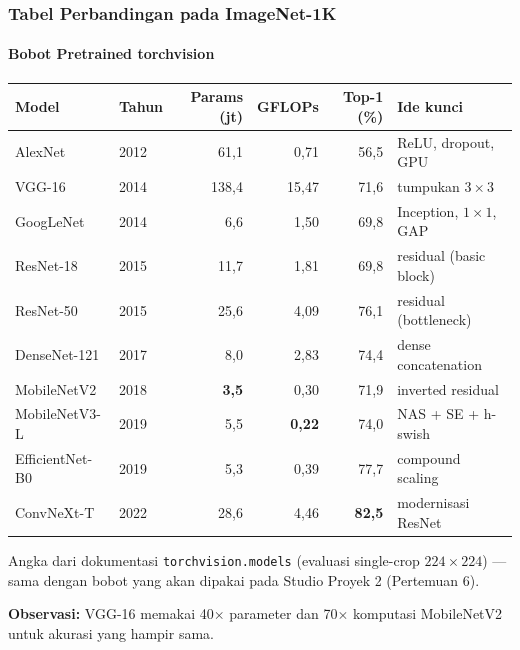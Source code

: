 \documentclass[t,aspectratio=169,xcolor=dvipsnames]{beamer}
\newcommand{\con}[1]{\textcolor{dlOrange}{#1}}
\begin{document}
\begin{frame}
    \frametitle{Tabel Perbandingan pada ImageNet-1K}
    \framesubtitle{Bobot Pretrained torchvision}
    \scriptsize
    \vspace{4pt}
    \begin{center}
    \begin{tabular}{llrrrl}
        \toprule
        \textbf{Model} & \textbf{Tahun} & \textbf{Params (jt)} & \textbf{GFLOPs} & \textbf{Top-1 (\%)} & \textbf{Ide kunci} \\
        \midrule
        AlexNet & 2012 & 61,1 & 0,71 & 56,5 & ReLU, dropout, GPU \\
        VGG-16 & 2014 & 138,4 & \con{15,47} & 71,6 & tumpukan $3\times3$ \\
        GoogLeNet & 2014 & 6,6 & 1,50 & 69,8 & Inception, $1\times1$, GAP \\
        ResNet-18 & 2015 & 11,7 & 1,81 & 69,8 & residual (basic block) \\
        ResNet-50 & 2015 & 25,6 & 4,09 & 76,1 & residual (bottleneck) \\
        DenseNet-121 & 2017 & 8,0 & 2,83 & 74,4 & dense concatenation \\
        MobileNetV2 & 2018 & \textbf{3,5} & 0,30 & 71,9 & inverted residual \\
        MobileNetV3-L & 2019 & 5,5 & \textbf{0,22} & 74,0 & NAS + SE + h-swish \\
        EfficientNet-B0 & 2019 & 5,3 & 0,39 & 77,7 & compound scaling \\
        ConvNeXt-T & 2022 & 28,6 & 4,46 & \textbf{82,5} & modernisasi ResNet \\
        \bottomrule
    \end{tabular}
    \end{center}
    \vspace{0.1cm}
    {\scriptsize\color{dlMute} Angka dari dokumentasi \texttt{torchvision.models} (evaluasi single-crop $224\times224$) --- sama dengan bobot yang akan dipakai pada Studio Proyek 2 (Pertemuan 6).}

    \vspace{0.1cm}
    \footnotesize
    \textbf{Observasi:} VGG-16 memakai 40$\times$ parameter dan 70$\times$ komputasi MobileNetV2 untuk akurasi yang hampir sama.
\end{frame}
\end{document}
